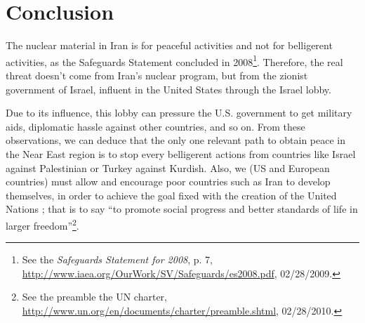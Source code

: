 \documentclass[10pt,a4paper]{scrartcl} %
\begin{document}
\section{Conclusion}

The nuclear material in Iran is for peaceful activities and not for belligerent activities, as the Safeguards Statement concluded in 2008\footnote{See the \emph{Safeguards Statement for 2008}, p. 7, \url{http://www.iaea.org/OurWork/SV/Safeguards/es2008.pdf}, 02/28/2009.}. Therefore, the real threat doesn't come from Iran's nuclear program, but from the zionist government of Israel, influent in the United States through the Israel lobby.

Due to its influence, this lobby can pressure the U.S. government to get military aids, diplomatic hassle against other countries, and so on. From these observations, we can deduce that the only one relevant path to obtain peace in the Near East region is to stop every belligerent actions from countries like Israel against Palestinian or Turkey against Kurdish. Also, we (US and European countries) must allow and encourage poor countries such as Iran to develop themselves, in order to achieve the goal fixed with the creation of the United Nations ; that is to say \textquotedblleft to promote social progress and better standards of life in larger freedom\textquotedblright\footnote{See the preamble the UN charter, \url{http://www.un.org/en/documents/charter/preamble.shtml}, 02/28/2010.}.
\end{document}
